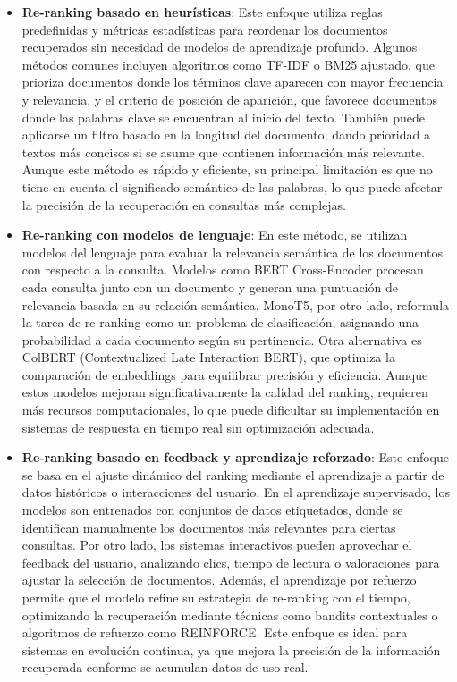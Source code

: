 \begin{itemize}
    \item \textbf{Re-ranking basado en heurísticas}: Este enfoque utiliza reglas predefinidas y métricas estadísticas para reordenar los documentos recuperados sin necesidad de modelos de aprendizaje profundo. 
    Algunos métodos comunes incluyen algoritmos como TF-IDF o BM25 ajustado, que prioriza documentos donde los términos clave aparecen con mayor frecuencia y relevancia, y el criterio de posición de aparición, que favorece documentos donde las palabras clave se encuentran al inicio del texto. 
    También puede aplicarse un filtro basado en la longitud del documento, dando prioridad a textos más concisos si se asume que contienen información más relevante. 
    Aunque este método es rápido y eficiente, su principal limitación es que no tiene en cuenta el significado semántico de las palabras, lo que puede afectar la precisión de la recuperación en consultas más complejas.

    \item \textbf{Re-ranking con modelos de lenguaje}: En este método, se utilizan modelos del lenguaje para evaluar la relevancia semántica de los documentos con respecto a la consulta. 
    Modelos como BERT Cross-Encoder procesan cada consulta junto con un documento y generan una puntuación de relevancia basada en su relación semántica. 
    MonoT5, por otro lado, reformula la tarea de re-ranking como un problema de clasificación, asignando una probabilidad a cada documento según su pertinencia. 
    Otra alternativa es ColBERT (Contextualized Late Interaction BERT), que optimiza la comparación de embeddings para equilibrar precisión y eficiencia. 
    Aunque estos modelos mejoran significativamente la calidad del ranking, requieren más recursos computacionales, lo que puede dificultar su implementación en sistemas de respuesta en tiempo real sin optimización adecuada.

    \item \textbf{Re-ranking basado en feedback y aprendizaje reforzado}: Este enfoque se basa en el ajuste dinámico del ranking mediante el aprendizaje a partir de datos históricos o interacciones del usuario. 
    En el aprendizaje supervisado, los modelos son entrenados con conjuntos de datos etiquetados, donde se identifican manualmente los documentos más relevantes para ciertas consultas. 
    Por otro lado, los sistemas interactivos pueden aprovechar el feedback del usuario, analizando clics, tiempo de lectura o valoraciones para ajustar la selección de documentos. 
    Además, el aprendizaje por refuerzo permite que el modelo refine su estrategia de re-ranking con el tiempo, optimizando la recuperación mediante técnicas como bandits contextuales o algoritmos de refuerzo como REINFORCE. 
    Este enfoque es ideal para sistemas en evolución continua, ya que mejora la precisión de la información recuperada conforme se acumulan datos de uso real.

\end{itemize}


